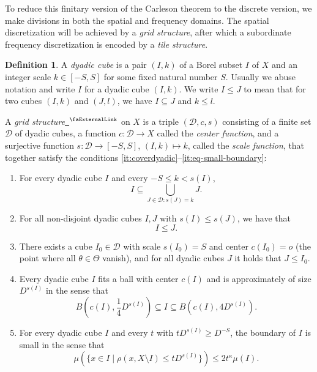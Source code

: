 \documentclass[12pt, reqno]{amsart}
\newcommand{\extlink}{~\ensuremath{{}^\text{\faExternalLink}}}
\theoremstyle{definition}
\newtheorem{definition}{Definition}[section]
\theoremstyle{plain}
\newcommand{\mfa}{{\theta}}
\newcommand{\Mf}{{\Theta}}
\begin{document}
To reduce this finitary version of the Carleson theorem to the discrete version, we make divisions in both the spatial and frequency domains. The spatial discretization will be achieved by a \emph{grid structure}, after which a subordinate frequency discretization is encoded by a \emph{tile structure}.

\begin{definition}\label{def:grid-structure}
A \emph{dyadic cube} is a pair $(I, k)$ of a Borel subset $I$ of $X$ and an integer scale $k \in [-S, S]$ for some fixed natural number $S$. Usually we abuse notation and write $I$ for a dyadic cube $(I, k)$. We write $I \le J$ to mean that for two cubes $(I, k)$ and $(J, l)$, we have $I \subseteq J$ and $k \le l$.

A \emph{grid structure}\href{https://github.com/fpvandoorn/carleson/blob/AFM-frozen/Carleson/GridStructure.lean#L20-L44}{\extlink} on $X$ is a triple $(\mathcal{D}, c, s)$ consisting of a finite set $\mathcal{D}$ of dyadic cubes, a function $c\colon \mathcal{D} \to X$ called the \emph{center function}, and a surjective function $s\colon \mathcal{D} \to [-S, S]$, $(I, k) \mapsto k$, called the \emph{scale function}, that together satisfy the conditions \ref{it:coverdyadic}--\ref{it:eq-small-boundary}:
\begin{enumerate}[label=(\roman*)]
\item \label{it:coverdyadic} For every dyadic cube $I$ and every $-S \leq k < s(I)$,
\begin{equation*}
    I\subseteq \bigcup_{J\in \mathcal {D}: s(J)=k}J.
\end{equation*}
\item \label{it:dyadicproperty} For all non-disjoint dyadic cubes $I, J$ with $s(I) \leq s(J)$, we have that
\begin{equation*}
    I\le J.
\end{equation*}
\item \label{it:subsetmaxcube} There exists a cube $I_0 \in \mathcal{D}$ with scale $s(I_0) = S$ and center $c(I_0) = o$ (the point where all $\mfa \in \Mf$ vanish), and for all dyadic cubes $J$ it holds that $J \le I_0$.
\item \label{it:eq-vol-sp-cube} Every dyadic cube $I$ fits a ball with center $c(I)$ and is approximately of size $D^{s(I)}$ in the sense that
\begin{equation}
    \label{eq-vol-sp-cube}
    B(c(I), \frac{1}{4} D^{s(I)}) \subseteq I \subseteq B(c(I), 4 D^{s(I)}).
\end{equation}
\item \label{it:eq-small-boundary} For every dyadic cube $I$ and every $t$ with $t D^{s(I)} \geq D^{-S}$, the boundary of $I$ is small in the sense that
\begin{equation*}
    \mu(\{x \in I \mid \rho(x, X \setminus I) \leq t D^{s(I)}\}) \le 2 t^\kappa \mu(I).
\end{equation*}
\end{enumerate}
\end{definition}
\end{document}
